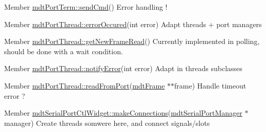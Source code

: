 \label{todo__todo000052}
\hypertarget{todo__todo000052}{}
 
\begin{DoxyDescription}
\item[Member \hyperlink{classmdt_port_term_a7ec568c44f862fe7aee83f1a271ac6bb}{mdtPortTerm::sendCmd}() ]Error handling ! 
\end{DoxyDescription}

\label{todo__todo000029}
\hypertarget{todo__todo000029}{}
 
\begin{DoxyDescription}
\item[Member \hyperlink{classmdt_port_thread_ab31cbe1a85aa830cd368654d1f806326}{mdtPortThread::errorOccured}(int error) ]Adapt threads + port managers
\end{DoxyDescription}

\label{todo__todo000030}
\hypertarget{todo__todo000030}{}
 
\begin{DoxyDescription}
\item[Member \hyperlink{classmdt_port_thread_a611211e56620ec9c699019452716e4fc}{mdtPortThread::getNewFrameRead}() ]Currently implemented in polling, should be done with a wait condition.
\end{DoxyDescription}

\label{todo__todo000031}
\hypertarget{todo__todo000031}{}
 
\begin{DoxyDescription}
\item[Member \hyperlink{classmdt_port_thread_ad2c618a032c0aeed0f0cb3b30bc0aba9}{mdtPortThread::notifyError}(int error) ]Adapt in threads subclasses 
\end{DoxyDescription}

\label{todo__todo000028}
\hypertarget{todo__todo000028}{}
 
\begin{DoxyDescription}
\item[Member \hyperlink{classmdt_port_thread_a2e0c384ae6c909cb40fc0ca1a0189ca6}{mdtPortThread::readFromPort}(\hyperlink{classmdt_frame}{mdtFrame} $\ast$$\ast$frame) ]Handle timeout error ? 
\end{DoxyDescription}

\label{todo__todo000050}
\hypertarget{todo__todo000050}{}
 
\begin{DoxyDescription}
\item[Member \hyperlink{classmdt_serial_port_ctl_widget_a9dce60a846cbf24d7ceab099ff147c18}{mdtSerialPortCtlWidget::makeConnections}(\hyperlink{classmdt_serial_port_manager}{mdtSerialPortManager} $\ast$manager) ]Create threads somwere here, and connect signals/slots 
\end{DoxyDescription}

